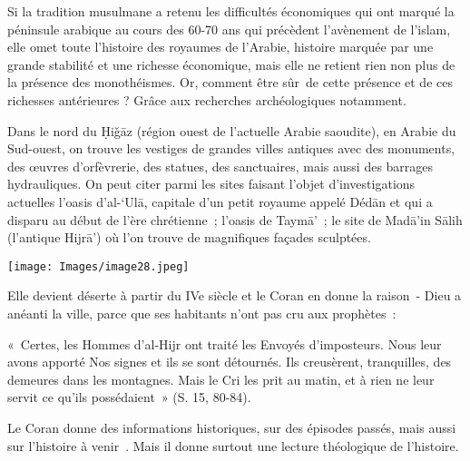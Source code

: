 Si la tradition musulmane a retenu les difficultés économiques qui ont
marqué la péninsule arabique au cours des 60-70 ans qui précèdent
l'avènement de l'islam, elle omet toute l'histoire des royaumes de
l'Arabie, histoire marquée par une grande stabilité et une richesse
économique, mais elle ne retient rien non plus de la présence des
monothéismes. Or, comment être sûr~de cette présence et de ces richesses
antérieures ? Grâce aux recherches archéologiques notamment.


Dans le nord du Ḥiǧāz (région ouest de l'actuelle Arabie saoudite), en
Arabie du Sud-ouest, on trouve les vestiges de grandes villes antiques
avec des monuments, des œuvres d'orfèvrerie, des statues, des
sanctuaires, mais aussi des barrages hydrauliques. On peut citer parmi
les sites faisant l'objet d'investigations actuelles l'oasis d'al-`Ulā,
capitale d'un petit royaume appelé Dédān et qui a disparu au début de
l'ère chrétienne~; l'oasis de Taymā'~; le site de Madā'in Sālih
(l'antique Hijrā') où l'on trouve de magnifiques façades sculptées.

\texttt{[image: Images/image28.jpeg]}

Elle devient déserte à partir du IVe siècle et le Coran en donne la
raison~- Dieu a anéanti la ville, parce que ses habitants n'ont pas cru
aux prophètes~:

«~Certes, les Hommes d'al-Hijr ont traité les Envoyés d'imposteurs. Nous
leur avons apporté Nos signes et ils se sont détournés. Ils creusèrent,
tranquilles, des demeures dans les montagnes. Mais le Cri les prit au
matin, et à rien ne leur servit ce qu'ils possédaient~» (S. 15,
80-84).


\begin{Synthesis}
Le Coran donne des informations
historiques, sur des épisodes passés, mais aussi sur l'histoire à
venir~. Mais il donne
surtout une lecture théologique de l'histoire.
\end{Synthesis}

